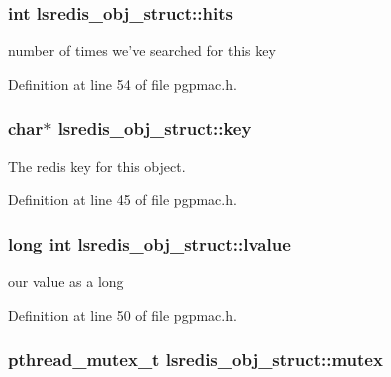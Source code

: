 \hypertarget{structlsredis__obj__struct_a43fcbff584654ab086d973ce34cb6ddc}{
\subsubsection[{hits}]{\setlength{\rightskip}{0pt plus 5cm}int lsredis\-\_\-obj\-\_\-struct\-::hits}}\label{structlsredis__obj__struct_a43fcbff584654ab086d973ce34cb6ddc}


number of times we've searched for this key 



Definition at line 54 of file pgpmac.\-h.

\hypertarget{structlsredis__obj__struct_aa8c5a453b9424e5666320b8675a42f5c}{
\subsubsection[{key}]{\setlength{\rightskip}{0pt plus 5cm}char$\ast$ lsredis\-\_\-obj\-\_\-struct\-::key}}\label{structlsredis__obj__struct_aa8c5a453b9424e5666320b8675a42f5c}


The redis key for this object. 



Definition at line 45 of file pgpmac.\-h.

\hypertarget{structlsredis__obj__struct_a26211a0ab3fc02e7776e24dbc1f1256c}{
\subsubsection[{lvalue}]{\setlength{\rightskip}{0pt plus 5cm}long int lsredis\-\_\-obj\-\_\-struct\-::lvalue}}\label{structlsredis__obj__struct_a26211a0ab3fc02e7776e24dbc1f1256c}


our value as a long 



Definition at line 50 of file pgpmac.\-h.

\hypertarget{structlsredis__obj__struct_a0da18e7d0f7d52459bbc6fbc696d5252}{
\subsubsection[{mutex}]{\setlength{\rightskip}{0pt plus 5cm}pthread\-\_\-mutex\-\_\-t lsredis\-\_\-obj\-\_\-struct\-::mutex}}\label{structlsredis__obj__struct_a0da18e7d0f7d52459bbc6fbc696d5252}



